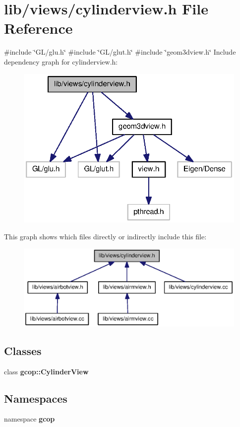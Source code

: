 \section{lib/views/cylinderview.h \-File \-Reference}
\label{cylinderview_8h}
{\ttfamily \#include \char`\"{}\-G\-L/glu.\-h\char`\"{}}\*
{\ttfamily \#include \char`\"{}\-G\-L/glut.\-h\char`\"{}}\*
{\ttfamily \#include \char`\"{}geom3dview.\-h\char`\"{}}\*
\-Include dependency graph for cylinderview.\-h\-:
\nopagebreak
\begin{figure}[H]
\begin{center}
\leavevmode
\includegraphics[width=322pt]{cylinderview_8h__incl}
\end{center}
\end{figure}
\-This graph shows which files directly or indirectly include this file\-:
\nopagebreak
\begin{figure}[H]
\begin{center}
\leavevmode
\includegraphics[width=350pt]{cylinderview_8h__dep__incl}
\end{center}
\end{figure}
\subsection*{\-Classes}
\begin{DoxyCompactItemize}
\item 
class {\bf gcop\-::\-Cylinder\-View}
\end{DoxyCompactItemize}
\subsection*{\-Namespaces}
\begin{DoxyCompactItemize}
\item 
namespace {\bf gcop}
\end{DoxyCompactItemize}
